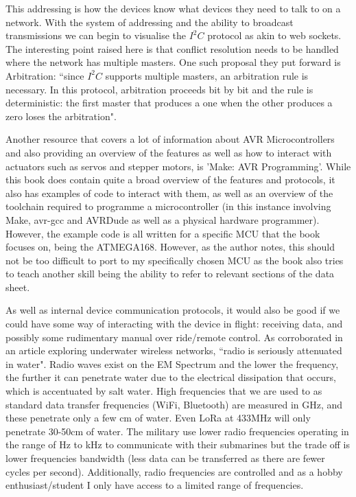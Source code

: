 \documentclass[11pt,a4paper,titlepage]{report}
\begin{document}
	This addressing is how the devices know what devices they need to talk to on a network. With the system of addressing and the ability to broadcast transmissions we can begin to visualise the $I^{2}C$ protocol as akin to web sockets. The interesting point raised here is that conflict resolution needs to be handled where the network has multiple masters. One such proposal they put forward is Arbitration: ``since $I^{2}C$ supports multiple masters, an arbitration rule is necessary. In this protocol, arbitration proceeds bit by bit and the rule is deterministic: the first master that produces a one when the other produces a zero loses the arbitration"\cite{I2C}. 
	
	Another resource that covers a lot of information about AVR Microcontrollers and also providing an overview of the features as well as how to interact with actuators such as servos and stepper motors, is 'Make: AVR Programming'\cite{MAKE_AVR}. While this book does contain quite a broad overview of the features and protocols, it also has examples of code to interact with them, as well as an overview of the toolchain required to programme a microcontroller (in this instance involving Make, avr-gcc\cite{GCC_AVR} and AVRDude\cite{AVRDUDE} as well as a physical hardware programmer). However, the example code is all written for a specific MCU that the book focuses on, being the ATMEGA168. However, as the author notes, this should not be too difficult to port to my specifically chosen MCU as the book also tries to teach another skill being the ability to refer to relevant sections of the data sheet. 
	
	As well as internal device communication protocols, it would also be good if we could have some way of interacting with the device in flight: receiving data, and possibly some rudimentary manual over ride/remote control. As corroborated in an article exploring underwater wireless networks, ``radio is seriously attenuated in water"\cite{UNDERWATER_RADIO}. Radio waves exist on the EM Spectrum and the lower the frequency, the further it can penetrate water due to the electrical dissipation that occurs, which is accentuated by salt water. High frequencies that we are used to as standard data transfer frequencies (WiFi, Bluetooth) are measured in \unit{\giga\hertz}, and these penetrate only a few \unit{\centi\meter} of water. Even LoRa at 433\unit{\mega\hertz} will only penetrate 30-50\unit{\centi\meter} of water. The military use lower radio frequencies operating in the range of \unit{\hertz} to \unit{\kilo\hertz} to communicate with their submarines but the trade off is lower frequencies bandwidth (less data can be transferred as there are fewer cycles per second). Additionally, radio frequencies are controlled\cite{RADIO_FREQ_TABLE} and as a hobby enthusiast/student I only have access to a limited range of frequencies.  
	
\end{document}
